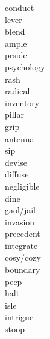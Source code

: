 \documentclass[a4paper, 10pt]{ctexart}
\begin{document}
\begin{multicols*}{2}
\begin{description}
\item[conduct]

\item[lever]

\item[blend]

\item[ample]

\item[prside]

\item[psychology]

\item[rash]

\item[radical]

\item[inventory]

\item[pillar]

\item[grip]

\item[antenna]

\item[sip]

\item[devise]

\item[diffuse]

\item[negligible]

\item[dine]

\item[gaol/jail]

\item[invasion]

\item[precedent]

\item[integrate]

\item[cosy/cozy]

\item[boundary]

\item[peep]

\item[halt]

\item[isle]

\item[intrigue]

\item[stoop]


\end{description}
\end{multicols*}
\end{document}
